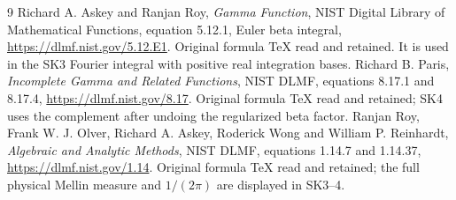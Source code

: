\documentclass[11pt]{article}
\begin{document}
\begin{thebibliography}{9}
 Richard A. Askey and Ranjan Roy,
\emph{Gamma Function}, NIST Digital Library of Mathematical Functions,
equation 5.12.1, Euler beta integral, \url{https://dlmf.nist.gov/5.12.E1}.
Original formula TeX read and retained. It is used in the SK3 Fourier
integral with positive real integration bases.
 Richard B. Paris, \emph{Incomplete Gamma and Related
Functions}, NIST DLMF, equations 8.17.1 and 8.17.4,
\url{https://dlmf.nist.gov/8.17}. Original formula TeX read and retained;
SK4 uses the complement after undoing the regularized beta factor.
 Ranjan Roy, Frank W. J. Olver, Richard A. Askey,
Roderick Wong and William P. Reinhardt, \emph{Algebraic and Analytic
Methods}, NIST DLMF, equations 1.14.7 and 1.14.37,
\url{https://dlmf.nist.gov/1.14}. Original formula TeX read and retained;
the full physical Mellin measure and $1/(2\pi)$ are displayed in SK3--4.
\end{thebibliography}
\end{document}
